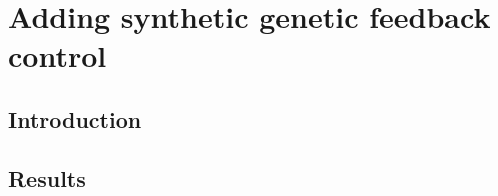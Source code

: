 \documentclass[../main.tex]{subfiles}
\begin{document}
\chapter{Adding synthetic genetic feedback control}\label{chapter6}
\section{Introduction}\label{chapter6:introduction}

\section{Results}\label{chapter6:results}
\end{document}
